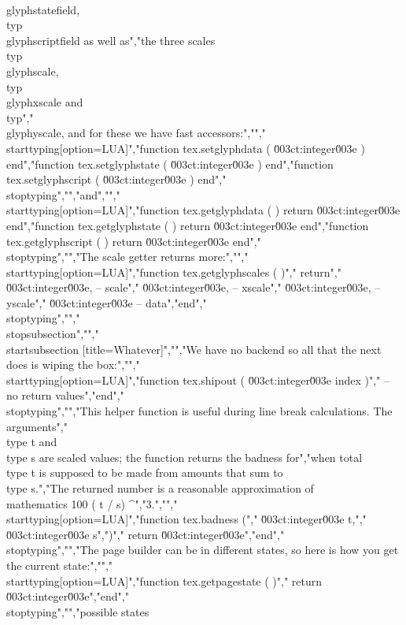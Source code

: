 {\\glyphstatefield}, \\typ {\\glyphscriptfield} as well as","the three scales \\typ {\\glyphscale}, \\typ {\\glyphxscale} and \\typ","{\\glyphyscale}, and for these we have fast accessors:","","\\starttyping[option=LUA]","function tex.setglyphdata   ( \u003ct:integer\u003e ) end","function tex.setglyphstate  ( \u003ct:integer\u003e ) end","function tex.setglyphscript ( \u003ct:integer\u003e ) end","\\stoptyping","","and","","\\starttyping[option=LUA]","function tex.getglyphdata   ( ) return \u003ct:integer\u003e end","function tex.getglyphstate  ( ) return \u003ct:integer\u003e end","function tex.getglyphscript ( ) return \u003ct:integer\u003e end","\\stoptyping","","The scale getter returns more:","","\\starttyping[option=LUA]","function tex.getglyphscales ( )","    return","        \u003ct:integer\u003e, -- scale","        \u003ct:integer\u003e, -- xscale","        \u003ct:integer\u003e, -- yscale","        \u003ct:integer\u003e  -- data","end","\\stoptyping","","\\stopsubsection","","\\startsubsection [title={Whatever}]","","We have no backend so all that the next does is wiping the box:","","\\starttyping[option=LUA]","function tex.shipout ( \u003ct:integer\u003e index )","    -- no return values","end","\\stoptyping","","This helper function is useful during line break calculations. The arguments","\\type {t} and \\type {s} are scaled values; the function returns the badness for","when total \\type {t} is supposed to be made from amounts that sum to \\type {s}.","The returned number is a reasonable approximation of \\mathematics {100 ( t / s) ^","3}.","","\\starttyping[option=LUA]","function tex.badness (","    \u003ct:integer\u003e t,","    \u003ct:integer\u003e s",")","    return \u003ct:integer\u003e","end","\\stoptyping","","The page builder can be in different states, so here is how you get the current state:","","\\starttyping[option=LUA]","function tex.getpagestate ( )","    return \u003ct:integer\u003e","end","\\stoptyping","","possible states 